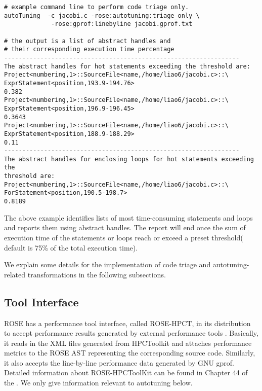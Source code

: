 {\mySmallFontSize
\begin{verbatim}
# example command line to perform code triage only.
autoTuning  -c jacobi.c -rose:autotuning:triage_only \
             -rose:gprof:linebyline jacobi.gprof.txt 

# the output is a list of abstract handles and 
# their corresponding execution time percentage
-----------------------------------------------------------------
The abstract handles for hot statements exceeding the threshold are:
Project<numbering,1>::SourceFile<name,/home/liao6/jacobi.c>::\
ExprStatement<position,193.9-194.76>
0.382
Project<numbering,1>::SourceFile<name,/home/liao6/jacobi.c>::\
ExprStatement<position,196.9-196.45>
0.3643
Project<numbering,1>::SourceFile<name,/home/liao6/jacobi.c>::\
ExprStatement<position,188.9-188.29>
0.11
-----------------------------------------------------------------
The abstract handles for enclosing loops for hot statements exceeding the
threshold are:
Project<numbering,1>::SourceFile<name,/home/liao6/jacobi.c>::\
ForStatement<position,190.5-198.7>
0.8189
\end{verbatim}
}

The above example identifies lists of most time-consuming statements and loops and reports them using abstract handles. 
The report will end once the sum of execution time of the statements or
loops reach or exceed a preset threshold( default is 75\% of the total execution time). 

We explain some details for the implementation of code triage and
autotuning-related transformations in the following subsections.
\subsection{Tool Interface}
ROSE has a performance tool interface, called ROSE-HPCT,
in its distribution to accept performance results generated by external
performance tools .  
Basically, it reads in the XML files generated from HPCToolkit and attaches performance metrics to
the ROSE AST representing the corresponding source code. 
Similarly, it also accepts the line-by-line performance data generated by GNU
gprof.
Detailed information about ROSE-HPCToolKit can be found in Chapter 44 of
the .
We only give information relevant to autotuning below.

